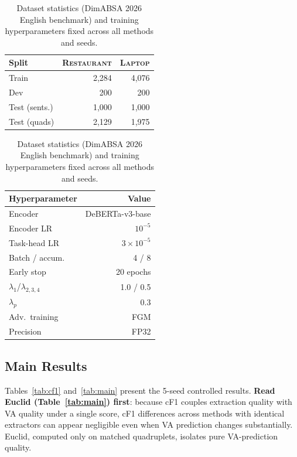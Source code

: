 \documentclass[runningheads]{llncs}
\newcommand{\restaurant}{{\normalfont\textsc{Restaurant}}}
\newcommand{\laptop}{{\normalfont\textsc{Laptop}}}
\begin{document}
\begin{table}[!h]
\centering\small
\caption{Dataset statistics (DimABSA 2026 English benchmark) and training hyperparameters fixed across all methods and seeds.}
\label{tab:datasets}
\vspace{2pt}
\begin{minipage}[t]{0.40\linewidth}
\centering
\begin{tabular}{@{}lrr@{}}
\toprule
\textbf{Split} & \textbf{\restaurant{}} & \textbf{\laptop{}} \\
\midrule
Train          & 2{,}284 & 4{,}076 \\
Dev            &     200 &     200 \\
Test (sents.)  & 1{,}000 & 1{,}000 \\
Test (quads)   & 2{,}129 & 1{,}975 \\
\bottomrule
\end{tabular}
\end{minipage}%
\hfill
\begin{minipage}[t]{0.56\linewidth}
\centering
\begin{tabular}{@{}lr@{}}
\toprule
\textbf{Hyperparameter} & \textbf{Value} \\
\midrule
Encoder                         & DeBERTa-v3-base \\
Encoder LR                      & $10^{-5}$ \\
Task-head LR                    & $3{\times}10^{-5}$ \\
Batch / accum.                  & 4 / 8 \\
Early stop                      & 20 epochs \\
$\lambda_1$/$\lambda_{2,3,4}$   & 1.0 / 0.5 \\
$\lambda_p$                     & 0.3 \\
Adv.\ training                  & FGM \\
Precision                       & FP32 \\
\bottomrule
\end{tabular}
\end{minipage}
\end{table}

\subsection{Main Results}

Tables~\ref{tab:cf1} and~\ref{tab:main} present the 5-seed controlled results. \textbf{Read Euclid (Table~\ref{tab:main}) first}: because cF1 couples extraction quality with VA quality under a single score, cF1 differences across methods with identical extractors can appear negligible even when VA prediction changes substantially. Euclid, computed only on matched quadruplets, isolates pure VA-prediction quality.
\end{document}
